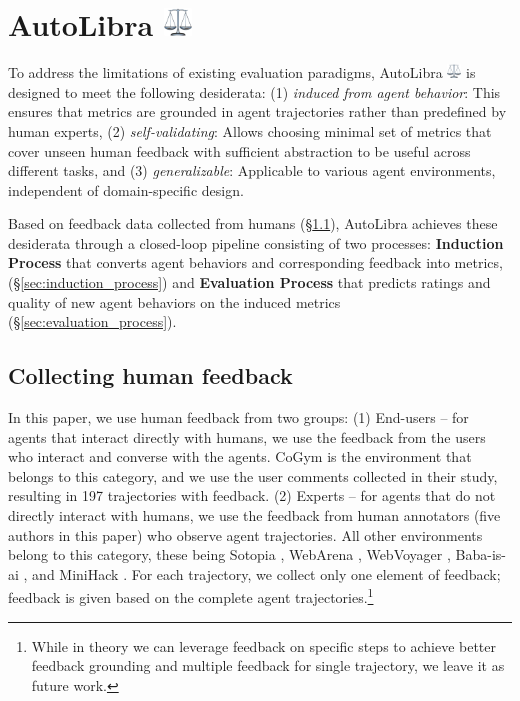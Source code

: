 \section{\texorpdfstring{AutoLibra \includegraphics[height=1em]{figs/scale.png}}{AutoLibra}}

To address the limitations of existing evaluation paradigms, AutoLibra \protect\includegraphics[height=1em]{figs/scale.png} is designed to
meet the following desiderata: (1) \emph{induced from agent behavior}: This ensures that metrics are grounded in agent trajectories rather than predefined by human experts, (2) \emph{self-validating}: Allows choosing minimal set of metrics that cover unseen human feedback with sufficient abstraction to be useful across different tasks, and (3) \emph{generalizable}: Applicable to various agent environments, independent of domain-specific design.

Based on feedback data collected from humans (\S\ref{sec:collecting-human-feedback}), AutoLibra achieves these desiderata through a closed-loop pipeline
consisting of two processes: \textbf{Induction Process} that converts agent behaviors and corresponding feedback into metrics, (\S\ref{sec:induction_process}) and \textbf{Evaluation Process} that predicts ratings and quality of new agent behaviors on the induced metrics (\S\ref{sec:evaluation_process}). 


\subsection{Collecting human feedback}
\label{sec:collecting-human-feedback}
In this paper, we use human feedback from two groups: (1) End-users -- for agents that interact directly with humans, we use the feedback from the users who interact and converse with the agents. CoGym \citep{shao2024collaborative}
is the environment that belongs to this category, and we use the user comments collected in their study, resulting
in 197 trajectories with feedback. (2) Experts -- for agents that
do not directly interact with humans, we use the feedback from human annotators (five authors in this paper) who observe agent trajectories. All other environments belong to this category, these being Sotopia \citep{zhousotopia}, WebArena \citep{zhouwebarena}, WebVoyager \citep{he2024webvoyager}, Baba-is-ai \citep{cloos2024babaaibreakrules}, and MiniHack \citep{samvelyan2021minihackplanetsandboxopenended}. For each trajectory, we collect only one element of feedback; feedback is given based on the complete agent trajectories.\footnote{While in theory we can leverage feedback on specific steps to achieve better feedback grounding and multiple feedback for single trajectory, we leave it as future work.}

